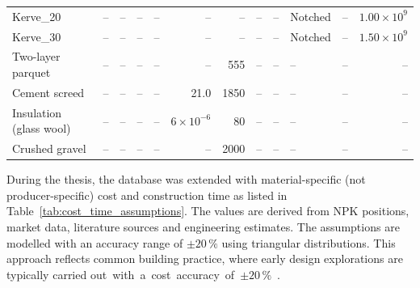 \begin{table}[h]
\begin{tabularx}{\textwidth}{@{}>{\raggedright\arraybackslash}X|r|r|r|r|r|r|r|r|>{\raggedright\arraybackslash}X|r|r@{}}
    Kerve\_20 &
    -- &
    -- &
    -- &
    -- &
    -- &
    -- &
    -- &
    -- &
    Notched &
    -- &
    $1.00 \times 10^9$ \\

    Kerve\_30 &
    -- &
    -- &
    -- &
    -- &
    -- &
    -- &
    -- &
    -- &
    Notched &
    -- &
    $1.50 \times 10^9$ \\

    Two-layer parquet &
    -- &
    -- &
    -- &
    -- &
    -- &
    555 &
    -- &
    -- &
    -- &
    -- &
    -- \\

    Cement screed &
    -- &
    -- &
    -- &
    -- &
    21.0 &
    1850 &
    -- &
    -- &
    -- &
    -- &
    -- \\

    Insulation (glass wool) &
    -- &
    -- &
    -- &
    -- &
    $6\times10^{-6}$ &
    80 &
    -- &
    -- &
    -- &
    -- &
    -- \\
    
    Crushed gravel &
    -- &
    -- &
    -- &
    -- &
    -- &
    2000 &
    -- &
    -- &
    -- &
    -- &
    -- \\

    \hline
    \end{tabularx}
    \endgroup
    
\end{table}

\newpage
During the thesis, the database was extended with material-specific (not producer-specific) cost and construction time as listed in Table~\ref{tab:cost_time_assumptions}. The values are derived from NPK positions, market data, literature sources and engineering estimates. The assumptions are modelled with an accuracy range of \(\pm 20\,\%\) using triangular distributions. This approach reflects common building practice, where early design explorations are typically carried \mbox{out with a cost accuracy of \(\pm 20\,\%\) \cite{MenzReichel2018_Kosten}.}


